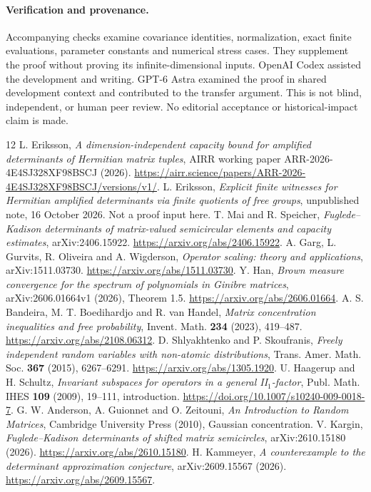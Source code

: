 \documentclass[11pt]{article}
\begin{document}
\paragraph{Verification and provenance.}
Accompanying checks examine covariance identities, normalization, exact finite evaluations, parameter constants and numerical stress cases. They supplement the proof without proving its infinite-dimensional inputs. OpenAI Codex assisted the development and writing. GPT-6 Astra examined the proof in shared development context and contributed to the transfer argument. This is not blind, independent, or human peer review. No editorial acceptance or historical-impact claim is made.

\begin{thebibliography}{12}
 L. Eriksson, \emph{A dimension-independent capacity bound for amplified determinants of Hermitian matrix tuples}, AIRR working paper ARR-2026-4E4SJ328XF98BSCJ (2026). \url{https://airr.science/papers/ARR-2026-4E4SJ328XF98BSCJ/versions/v1/}.
 L. Eriksson, \emph{Explicit finite witnesses for Hermitian amplified determinants via finite quotients of free groups}, unpublished note, 16 October 2026. Not a proof input here.
 T. Mai and R. Speicher, \emph{Fuglede--Kadison determinants of matrix-valued semicircular elements and capacity estimates}, arXiv:2406.15922. \url{https://arxiv.org/abs/2406.15922}.
 A. Garg, L. Gurvits, R. Oliveira and A. Wigderson, \emph{Operator scaling: theory and applications}, arXiv:1511.03730. \url{https://arxiv.org/abs/1511.03730}.
 Y. Han, \emph{Brown measure convergence for the spectrum of polynomials in Ginibre matrices}, arXiv:2606.01664v1 (2026), Theorem 1.5. \url{https://arxiv.org/abs/2606.01664}.
 A. S. Bandeira, M. T. Boedihardjo and R. van Handel, \emph{Matrix concentration inequalities and free probability}, Invent. Math. \textbf{234} (2023), 419--487. \url{https://arxiv.org/abs/2108.06312}.
 D. Shlyakhtenko and P. Skoufranis, \emph{Freely independent random variables with non-atomic distributions}, Trans. Amer. Math. Soc. \textbf{367} (2015), 6267--6291. \url{https://arxiv.org/abs/1305.1920}.
 U. Haagerup and H. Schultz, \emph{Invariant subspaces for operators in a general II$_1$-factor}, Publ. Math. IHES \textbf{109} (2009), 19--111, introduction. \url{https://doi.org/10.1007/s10240-009-0018-7}.
 G. W. Anderson, A. Guionnet and O. Zeitouni, \emph{An Introduction to Random Matrices}, Cambridge University Press (2010), Gaussian concentration.
 V. Kargin, \emph{Fuglede--Kadison determinants of shifted matrix semicircles}, arXiv:2610.15180 (2026). \url{https://arxiv.org/abs/2610.15180}.
 H. Kammeyer, \emph{A counterexample to the determinant approximation conjecture}, arXiv:2609.15567 (2026). \url{https://arxiv.org/abs/2609.15567}.
\end{thebibliography}
\end{document}
